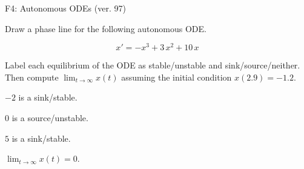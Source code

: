 \begin{exercise}
  \begin{exerciseTitle}F4: Autonomous ODEs (ver. 97)\end{exerciseTitle}
  \begin{exerciseStatement}
    

      Draw a phase line for the following 
      autonomous ODE.
    

    
\[x'= -x^{3} + 3 \, x^{2} + 10 \, x\]

    

      Label each equilibrium of the ODE
      as stable/unstable and sink/source/neither.
      Then compute \(\lim_{t\to\infty}x(t)\)
      assuming the initial condition
      \(x( 2.9 )= -1.2\).
    

  \end{exerciseStatement}
  \begin{exerciseAnswer}
    

      \(-2\) is a sink/stable.
      
        \(0\) is a source/unstable.
      
      \(5\) is a sink/stable.
    

    

      \(\lim_{t\to\infty}x(t)=0\).
    

  \end{exerciseAnswer}
\end{exercise}